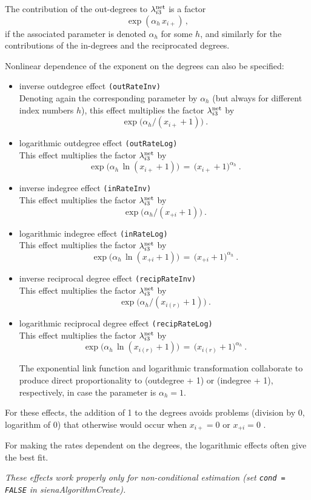 \documentclass[a4paper,fleqn,11pt]{article}
\newcommand{\+}{\, + \,}
\newcommand{\sfn}[1]{\textsf{#1}}
\begin{document}
\begin{enumerate}
The contribution of the out-degrees to $\lambda^{\rm net}_{i3}$
is a factor
 \[ \exp( \alpha_h \, x_{i+})\,, \]
if the associated parameter is denoted $\alpha_h$ for some $h$,
and similarly for the contributions of the in-degrees and the
reciprocated degrees.

 Nonlinear dependence of the exponent on the degrees
 can also be specified:
 \begin{itemize}
 \item inverse outdegree effect  \texttt{(outRateInv)} \\
 Denoting again the corresponding parameter by $\alpha_h$
 (but always for different index numbers $h$),
 this effect multiplies the factor $\lambda^{\rm net}_{i3}$ by
 \[ \exp\big( \alpha_h / (x_{i+} +1)\big) \ . \]
 \item logarithmic outdegree effect  \texttt{(outRateLog)} \\
 This effect multiplies the factor $\lambda^{\rm net}_{i3}$ by
 \[ \exp\big(\alpha_h\, \ln (x_{i+} +1)\big) \,=\,
                 \big(x_{i+} +1\big)^{\alpha_h} \ . \]

 \item inverse indegree effect  \texttt{(inRateInv)} \\
 This effect multiplies the factor $\lambda^{\rm net}_{i3}$ by
 \[ \exp\big( \alpha_h / (x_{+i} +1)\big) \ . \]
 \item logarithmic indegree effect  \texttt{(inRateLog)} \\
 This effect multiplies the factor $\lambda^{\rm net}_{i3}$ by
 \[ \exp\big(\alpha_h\, \ln (x_{+i} +1) \big) \,=\,
                 \big(x_{+i} +1\big)^{\alpha_h} \ . \]


 \item inverse reciprocal degree effect  \texttt{(recipRateInv)} \\
 This effect multiplies the factor $\lambda^{\rm net}_{i3}$ by
 \[ \exp\big( \alpha_h / (x_{i(r)} +1)\big) \ . \]
 \item logarithmic reciprocal degree effect  \texttt{(recipRateLog)} \\
 This effect multiplies the factor $\lambda^{\rm net}_{i3}$ by
 \[ \exp\big(\alpha_h \, \ln(x_{i(r)} +1)\big) \,=\,
                 \big(x_{i(r)} +1\big)^{\alpha_h} \ . \]

 The exponential link function and logarithmic transformation collaborate
 to produce direct proportionality to (outdegree + 1) or (indegree + 1),
 respectively, in case the parameter is $\alpha_h=1$.
 \end{itemize}
 For these effects, the addition of 1 to the degrees avoids
 problems (division by 0, logarithm of 0) that otherwise would occur
 when $ x_{i+} = 0$ or $ x_{+i} = 0$ .

 For making the rates dependent on the degrees,
 the  logarithmic effects often give the best fit.

 \emph{These effects work properly only for non-conditional estimation
    (set \texttt{cond = FALSE} in \sfn{sienaAlgorithmCreate}).  }
\end{enumerate}
\end{document}
